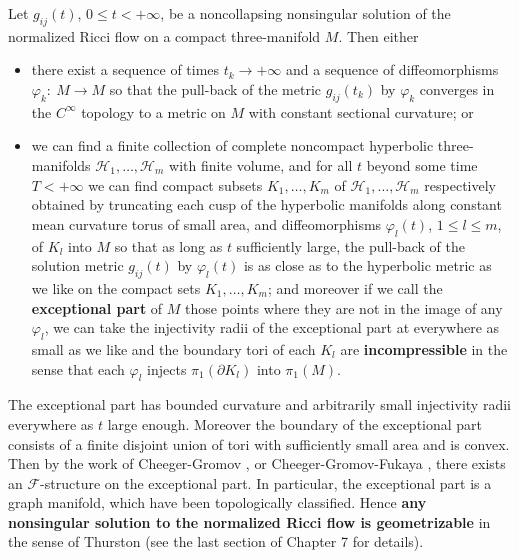 \begin{theorem}
  \label{thm:cz-noncollapsing-nonsingular-flow-structure}

Let $g_{ij}(t)$, $0\leq t<+\infty$, be a noncollapsing nonsingular
solution of the normalized Ricci flow on a compact three-manifold
$M$. Then either
\begin{itemize}
\item[(i)] there exist a sequence of times $t_k\rightarrow+\infty$
and a sequence of diffeomorphisms $\varphi_k:\ M\rightarrow M$ so
that the pull-back of the metric $g_{ij}(t_k)$ by $\varphi_k$
converges in the $C^\infty$ topology to a metric on $M$ with
constant sectional curvature; or \item[(ii)] we can find a finite
collection of complete noncompact hyperbolic three-manifolds
$\mathcal{H}_1,\ldots,\mathcal{H}_m$ with finite volume, and for
all $t$ beyond some time $T<+\infty$ we can find compact subsets
$K_1,\ldots,K_m$ of $\mathcal{H}_1,\ldots,\mathcal{H}_m$
respectively obtained by truncating each cusp of the hyperbolic
manifolds along constant mean curvature torus of small area, and
diffeomorphisms $\varphi_l(t)$, $1\leq l\leq m$, of $K_l$ into $M$
so that as long as $t$ sufficiently large, the pull-back of the
solution metric $g_{ij}(t)$ by $\varphi_l(t)$ is as close as to
the hyperbolic metric as we like on the compact sets
$K_1,\ldots,K_m$; and moreover if we call the \textbf{exceptional
part} of $M$ those points where they are not in the image of any
$\varphi_l$, we can take the injectivity radii of the exceptional
part at everywhere as small as we like and the boundary tori of
each $K_l$ are \textbf{incompressible} in the sense that each
$\varphi_l$ injects $\pi_1(\partial K_l)$ into $\pi_1(M)$.
 
\end{itemize}
\end{theorem}
\begin{remark}
  \label{rem:cz-exceptional-long-time-region-geometry}

The exceptional part has bounded curvature and arbitrarily small
injectivity radii everywhere as $t$ large enough. Moreover the
boundary of the exceptional part consists of a finite disjoint
union of tori with sufficiently small area and is convex. Then by
the work of Cheeger-Gromov \cite{ChG86}, \cite{ChG90} or
Cheeger-Gromov-Fukaya \cite{CGF92}, there exists an
$\mathcal{F}$-structure on the exceptional part. In particular,
the exceptional part is a graph manifold, which have been
topologically classified. Hence \textbf{any nonsingular solution
to the normalized Ricci flow is geometrizable} in the sense of
Thurston (see the last section of Chapter 7 for details).
\end{remark}

